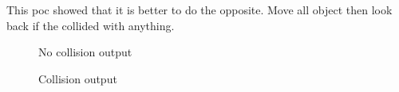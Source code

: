 \documentclass{projdoc}
\begin{document}
This \gls{poc} showed that it is better to do the opposite. Move all object then look
back if the collided with anything.

\begin{figure}
	\centering
	\caption{No collision  output}
	\label{fig:poc-no-collision}
\end{figure}

\begin{figure}
	\centering
	\caption{Collision  output}
	\label{fig:poc-collision}
\end{figure}
\end{document}
